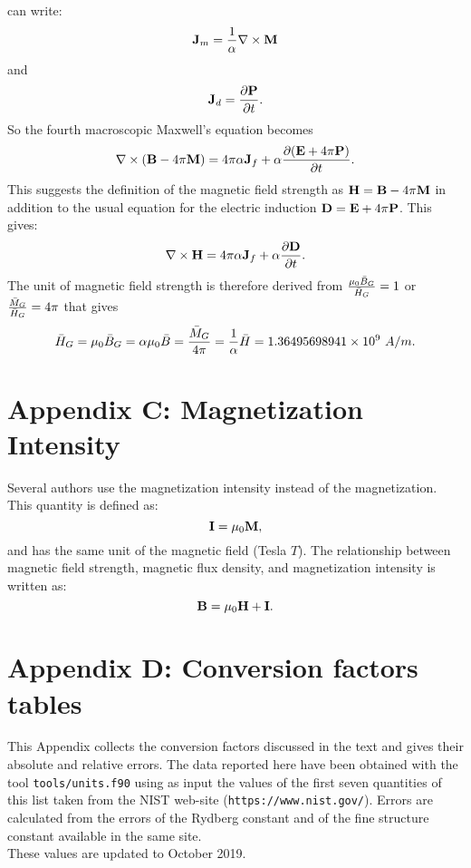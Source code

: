 \documentclass[12pt,a4paper]{article}
\def\barhg{1.36495698941\times 10^{9}}
\begin{document}
{can write:
\begin{equation}
{\bf J}_m={1\over \alpha} \nabla \times {\bf M}
\end{equation}
and 
\begin{equation}
{\bf J}_d={\partial {\bf P} \over \partial t}.
\end{equation}
So the fourth macroscopic Maxwell's equation becomes
\begin{equation}
\nabla \times ({\bf B}-4\pi {\bf M})= 4 \pi \alpha {\bf J}_f + \alpha
{\partial ({\bf E}+4\pi {\bf P}) \over \partial t}.
\end{equation}
This suggests the definition of the magnetic field strength as
${\bf H}={\bf B}-4 \pi {\bf M}$ in addition to the usual equation 
for the electric induction ${\bf D} = {\bf E}+4\pi {\bf P}$. 
This gives:
\begin{equation}
\nabla \times {\bf H}= 4 \pi \alpha {\bf J}_f + \alpha
{\partial {\bf D} \over \partial t}.
\end{equation}
The unit of magnetic field strength is therefore derived from
${\mu_0 \bar B_G \over \bar H_G}=1$ or ${\bar M_G \over \bar H_G}=4 \pi$ that
gives
\begin{equation}
\bar H_G = \mu_0 \bar B_G=\alpha \mu_0 \bar B={\bar M_G \over 4 \pi}= 
{1\over \alpha} \bar H=\barhg\ A/m.
\end{equation}
}
\newpage

\section{\color{coral} Appendix C: Magnetization Intensity}

Several authors use the magnetization intensity instead of the
magnetization. This quantity is defined as:
\begin{equation}
{\bf I}=\mu_0 {\bf M},
\end{equation}
and has the same unit of the magnetic field (Tesla $T$). 
The relationship between magnetic field strength, magnetic flux
density, and magnetization intensity is written as:
\begin{equation}
{\bf B}= \mu_0 {\bf H} + {\bf I}.
\end{equation} 

\section{\color{coral} Appendix D: Conversion factors tables}

This Appendix collects the conversion factors discussed in the text
and gives their absolute and relative errors. 
The data reported here have been obtained with the tool 
\texttt{tools/units.f90} using as input the values of the first seven
quantities of this list taken from the NIST web-site 
(\texttt{https://www.nist.gov/}). 
Errors are calculated from the errors of the Rydberg constant and of
the fine structure constant available in the same site. \\
These values are updated to October 2019.
\end{document}
